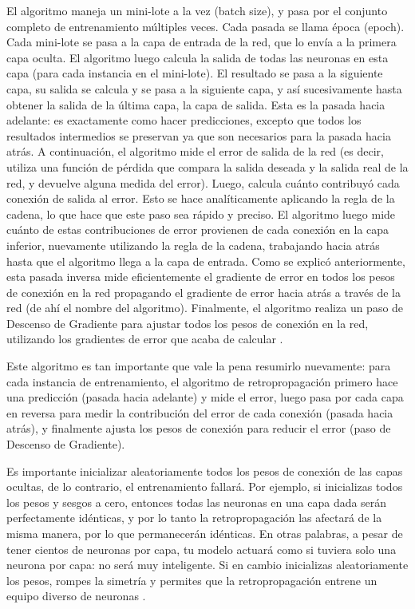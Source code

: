 El algoritmo maneja un mini-lote a la vez (batch size), y pasa por el conjunto completo de entrenamiento múltiples veces. Cada pasada se llama época (epoch). Cada mini-lote se pasa a la capa de entrada de la red, que lo envía a la primera capa oculta. El algoritmo luego calcula la salida de todas las neuronas en esta capa (para cada instancia en el mini-lote). El resultado se pasa a la siguiente capa, su salida se calcula y se pasa a la siguiente capa, y así sucesivamente hasta obtener la salida de la última capa, la capa de salida. Esta es la pasada hacia adelante: es exactamente como hacer predicciones, excepto que todos los resultados intermedios se preservan ya que son necesarios para la pasada hacia atrás. A continuación, el algoritmo mide el error de salida de la red (es decir, utiliza una función de pérdida que compara la salida deseada y la salida real de la red, y devuelve alguna medida del error). Luego, calcula cuánto contribuyó cada conexión de salida al error. Esto se hace analíticamente aplicando la regla de la cadena, lo que hace que este paso sea rápido y preciso. El algoritmo luego mide cuánto de estas contribuciones de error provienen de cada conexión en la capa inferior, nuevamente utilizando la regla de la cadena, trabajando hacia atrás hasta que el algoritmo llega a la capa de entrada. Como se explicó anteriormente, esta pasada inversa mide eficientemente el gradiente de error en todos los pesos de conexión en la red propagando el gradiente de error hacia atrás a través de la red (de ahí el nombre del algoritmo). Finalmente, el algoritmo realiza un paso de Descenso de Gradiente para ajustar todos los pesos de conexión en la red, utilizando los gradientes de error que acaba de calcular \citep{geron2022hands}.

Este algoritmo es tan importante que vale la pena resumirlo nuevamente: para cada instancia de entrenamiento, el algoritmo de retropropagación primero hace una predicción (pasada hacia adelante) y mide el error, luego pasa por cada capa en reversa para medir la contribución del error de cada conexión (pasada hacia atrás), y finalmente ajusta los pesos de conexión para reducir el error (paso de Descenso de Gradiente).

Es importante inicializar aleatoriamente todos los pesos de conexión de las capas ocultas, de lo contrario, el entrenamiento fallará. Por ejemplo, si inicializas todos los pesos y sesgos a cero, entonces todas las neuronas en una capa dada serán perfectamente idénticas, y por lo tanto la retropropagación las afectará de la misma manera, por lo que permanecerán idénticas. En otras palabras, a pesar de tener cientos de neuronas por capa, tu modelo actuará como si tuviera solo una neurona por capa: no será muy inteligente. Si en cambio inicializas aleatoriamente los pesos, rompes la simetría y permites que la retropropagación entrene un equipo diverso de neuronas \citep{geron2022hands}.


